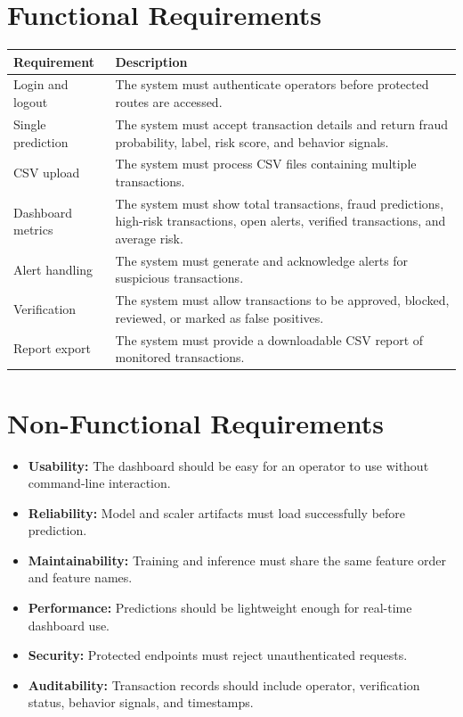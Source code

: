 \documentclass[12pt,a4paper]{report}
\begin{document}
\section{Functional Requirements}
\begin{longtable}{p{} p{}}
\toprule
\textbf{Requirement} & \textbf{Description} \\
\midrule
Login and logout & The system must authenticate operators before protected routes are accessed. \\
Single prediction & The system must accept transaction details and return fraud probability, label, risk score, and behavior signals. \\
CSV upload & The system must process CSV files containing multiple transactions. \\
Dashboard metrics & The system must show total transactions, fraud predictions, high-risk transactions, open alerts, verified transactions, and average risk. \\
Alert handling & The system must generate and acknowledge alerts for suspicious transactions. \\
Verification & The system must allow transactions to be approved, blocked, reviewed, or marked as false positives. \\
Report export & The system must provide a downloadable CSV report of monitored transactions. \\
\bottomrule
\end{longtable}

\section{Non-Functional Requirements}
\begin{itemize}
    \item \textbf{Usability:} The dashboard should be easy for an operator to use without command-line interaction.
    \item \textbf{Reliability:} Model and scaler artifacts must load successfully before prediction.
    \item \textbf{Maintainability:} Training and inference must share the same feature order and feature names.
    \item \textbf{Performance:} Predictions should be lightweight enough for real-time dashboard use.
    \item \textbf{Security:} Protected endpoints must reject unauthenticated requests.
    \item \textbf{Auditability:} Transaction records should include operator, verification status, behavior signals, and timestamps.
\end{itemize}
\end{document}
